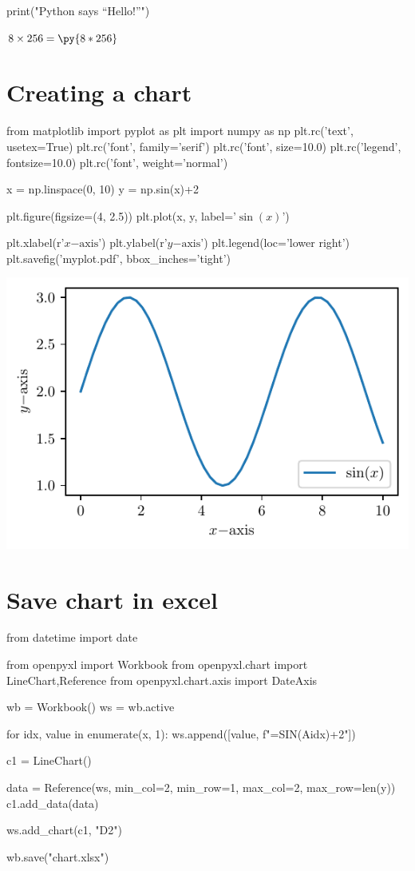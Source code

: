 \documentclass{article}
\newcommand{\pymultiply}[2]{\py{#1*#2}}
\begin{document}
\begin{pycode}
print("Python says ``Hello!''")
\end{pycode}

$8 \times 256 = \pymultiply{8}{256}$

\section{Creating a chart}
\begin{pylabblock}
from matplotlib import pyplot as plt
import numpy as np
plt.rc('text', usetex=True)
plt.rc('font', family='serif')
plt.rc('font', size=10.0)
plt.rc('legend', fontsize=10.0)
plt.rc('font', weight='normal')

x = np.linspace(0, 10)
y = np.sin(x)+2

plt.figure(figsize=(4, 2.5))
plt.plot(x, y, label='$\sin(x)$')

plt.xlabel(r'$x\mathrm{-axis}$')
plt.ylabel(r'$y\mathrm{-axis}$')
plt.legend(loc='lower right')
plt.savefig('myplot.pdf', bbox_inches='tight')
\end{pylabblock}

\begin{center}
\includegraphics{myplot.pdf}
\end{center}

\section{Save chart in excel}
\begin{pylabblock}
from datetime import date

from openpyxl import Workbook
from openpyxl.chart import LineChart,Reference
from openpyxl.chart.axis import DateAxis

wb = Workbook()
ws = wb.active

for idx, value in enumerate(x, 1):
    ws.append([value, f"=SIN(A{idx})+2"])

c1 = LineChart()

data = Reference(ws, min_col=2, min_row=1, max_col=2, max_row=len(y))
c1.add_data(data)

ws.add_chart(c1, "D2")

wb.save("chart.xlsx")
\end{pylabblock}
\end{document}
